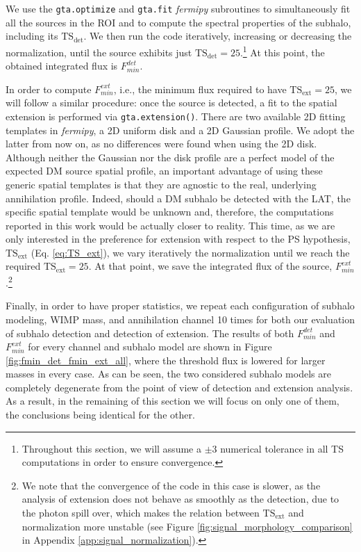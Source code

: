 \documentclass[%
 reprint,
nofootinbib,
 amsmath,amssymb,
 aps,
]{revtex4-2}
\begin{document}
We use the \texttt{gta.optimize} and \texttt{gta.fit} \textit{fermipy} subroutines to simultaneously fit all the sources in the ROI and to compute the spectral properties of the subhalo, including its $\mathrm{TS_{det}}$. We then run the code iteratively, increasing or decreasing the normalization, until the source exhibits just $\mathrm{TS_{det}}=25$.\footnote{Throughout this section, we will assume a $\pm3$ numerical tolerance in all TS computations in order to ensure convergence.} At this point, the obtained integrated flux is $F_{min}^{det}$.

In order to compute $F_{min}^{ext}$, i.e., the minimum flux required to have $\mathrm{TS_{ext}}=25$, we will follow a similar procedure: once the source is detected, a fit to the spatial extension is performed via \texttt{gta.extension()}. There are two available 2D fitting templates in \textit{fermipy}, a 2D uniform disk and a 2D Gaussian profile. We adopt the latter from now on, as no differences were found when using the 2D disk. Although neither the Gaussian nor the disk profile are a perfect model of the expected DM source spatial profile, an important advantage of using these generic spatial templates is that they are agnostic to the real, underlying annihilation profile. Indeed, should a DM subhalo be detected with the LAT, the specific spatial template would be unknown and, therefore, the computations reported in this work would be actually closer to reality. This time, as we are only interested in the preference for extension with respect to the PS hypothesis, $\mathrm{TS_{ext}}$ (Eq. \ref{eq:TS_ext}), we vary iteratively the normalization until we reach the required $\mathrm{TS_{ext}}=25$. At that point, we save the integrated flux of the source, $F_{min}^{ext}$.\footnote{We note that the convergence of the code in this case is slower, as the analysis of extension does not behave as smoothly as the detection, due to the photon spill over, which makes the relation between  $\mathrm{TS_{ext}}$ and normalization more unstable (see Figure \ref{fig:signal_morphology_comparison} in Appendix \ref{app:signal_normalization}).}

Finally, in order to have proper statistics, we repeat each configuration of subhalo modeling, WIMP mass, and annihilation channel 10 times for both our evaluation of subhalo detection and detection of extension. The results of both $F_{min}^{det}$ and $F_{min}^{ext}$ for every channel and subhalo model are shown in Figure \ref{fig:fmin_det_fmin_ext_all}, where the threshold flux is lowered for larger masses in every case. As can be seen, the two considered subhalo models are completely degenerate from the point of view of detection and extension analysis. As a result, in the remaining of this section we will focus on only one of them, the conclusions being identical for the other.
\end{document}
